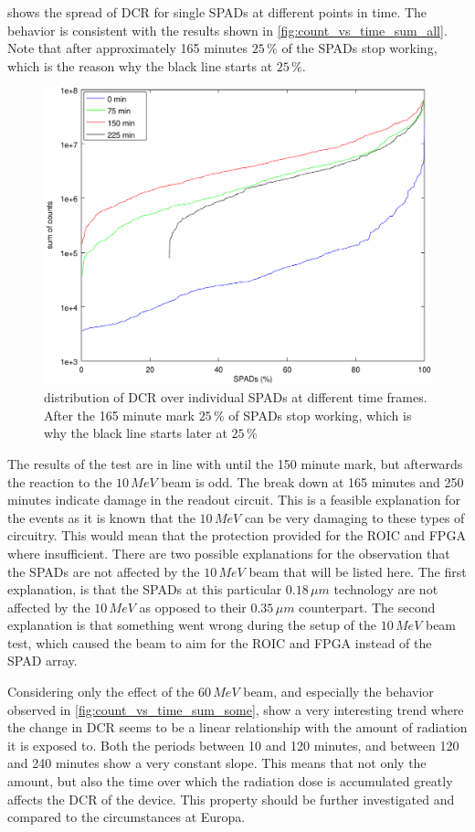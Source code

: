  shows the spread of DCR for single SPADs at different points in time. The behavior is consistent with the results shown in \cref{fig:count_vs_time_sum_all}. Note that after approximately 165 minutes $25\,\%$ of the SPADs stop working, which is the reason why the black line starts at $25\,\%$.

\begin{figure}[h]
\centering
	\includegraphics[width=0.6\linewidth]{fig/sigmoid_sweep.pdf}
\caption{distribution of DCR over individual SPADs at different time frames. After the 165 minute mark $25\,\%$ of SPADs stop working, which is why the black line starts later at $25\,\%$}
\label{fig:sigmoid_sweep}
\end{figure}


The results of the test are in line with until the 150 minute mark, but afterwards the reaction to the $10\,MeV$ beam is odd. The break down at 165 minutes and 250 minutes indicate damage in the readout circuit. This is a feasible explanation for the events as it is known that the $10\,MeV$ can be very damaging to these types of circuitry. This would mean that the protection provided for the ROIC and FPGA where insufficient. There are two possible explanations for the observation that the SPADs are not affected by the $10\,MeV$ beam that will be listed here. The first explanation, is that the SPADs at this particular $0.18\,\mu m$ technology are not affected by the $10\,MeV$ as opposed to their $0.35\,\mu m$ counterpart. The second explanation is that something went wrong during the setup of the $10\,MeV$ beam test, which caused the beam to aim for the ROIC and FPGA instead of the SPAD array. 

Considering only the effect of the $60\,MeV$ beam, and especially the behavior observed in \cref{fig:count_vs_time_sum_some}, show a very interesting trend where the change in DCR seems to be a linear relationship with the amount of radiation it is exposed to. Both the periods between 10 and 120 minutes, and between 120 and 240 minutes show a very constant slope. This means that not only the amount, but also the time over which the radiation dose is accumulated greatly affects the DCR of the device. This property should be further investigated and compared to the circumstances at Europa.

